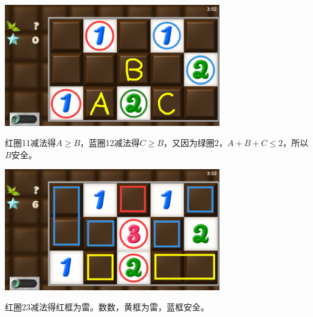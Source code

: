 \subsection{} %
\begin{center}
    \includegraphics[width=0.7\textwidth]{puzzle/92-1.png}
\end{center}
红圈11减法得$A\ge B$，蓝圈12减法得$C\ge B$，又因为绿圈2，$A+B+C\le 2$，所以$B$安全。
\begin{center}
    \includegraphics[width=0.7\textwidth]{puzzle/92-2.png}
\end{center}
红圈23减法得红框为雷。数数，黄框为雷，蓝框安全。

